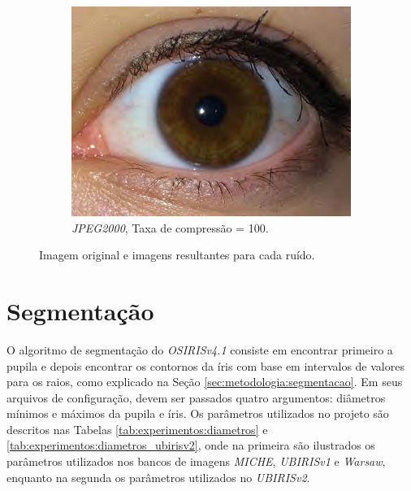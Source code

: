 \begin{figure}[H]
\begin{subfigure}{0.25\textwidth}
  \includegraphics[width=\linewidth]{img/Resultados/ruidos/jpeg2000_100.jpg}
  \caption{\textit{JPEG2000}, Taxa de compressão = 100.}
\end{subfigure}
\caption{Imagem original e imagens resultantes para cada ruído.}
\label{fig:experimentos:ruidos}
\end{figure}

\FloatBarrier

\section{Segmentação} \label{sec:experimentos:segmentacao}


\par O algoritmo de segmentação do \textit{OSIRISv4.1} consiste em encontrar primeiro a pupila e depois encontrar os contornos da íris com base em intervalos de valores para os raios, como explicado na Seção \ref{sec:metodologia:segmentacao}. Em seus arquivos de configuração, devem ser passados quatro argumentos: diâmetros mínimos e máximos da pupila e íris. Os parâmetros utilizados no projeto são descritos nas Tabelas \ref{tab:experimentos:diametros} e \ref{tab:experimentos:diametros_ubirisv2}, onde na primeira são ilustrados os parâmetros utilizados nos bancos de imagens \textit{MICHE}, \textit{UBIRISv1} e \textit{\acrshort{Warsaw}}, enquanto na segunda os parâmetros utilizados no \textit{UBIRISv2}.

